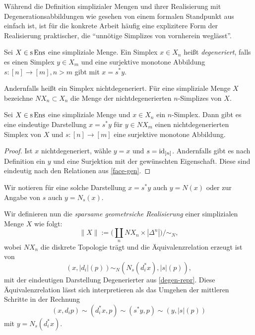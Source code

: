 Während die Definition simplizialer Mengen und ihrer Realisierung mit
Degenerationsabbildungen wie gesehen von einem formalen Standpunkt aus
einfach ist, ist für die konkrete Arbeit häufig eine explizitere Form
der Realisierung praktischer, die ``unnötige Simplizes von vornherein
weglässt''.
\begin{defn}[\cite{GM}, I.2.9]
  Sei $X \in \operatorname{s}\operatorname{Ens}$ eine simpliziale Menge. Ein Simplex $x \in X_n$
  heißt \emph{degeneriert}, falls es einen Simplex $y \in X_m$ und
  eine surjektive monotone Abbildung $s: [n] \to [m], n > m$ gibt mit
  $x = s^* y$.
\end{defn}
Andernfalls heißt ein Simplex nichtdegeneriert. Für eine simpliziale
Menge $X$ bezeichne $NX_n \subset X_n$ die Menge der
nichtdegenerierten $n$-Simplizes von $X$.
\begin{lemma} \label{degen-repr}
  Sei $X \in \operatorname{s}\operatorname{Ens}$ eine simpliziale Menge und $x \in X_n$ ein
  $n$-Simplex. Dann gibt es eine eindeutige Darstellung $x = s^* y$
  für $y \in NX_m$ einen nichtdegenerierten Simplex von $X$ und $s:
  [n] \to [m]$ eine surjektive monotone Abbildung.
\end{lemma}
\begin{proof}
  Ist $x$ nichtdegeneriert, wähle $y = x$ und $s =
  \operatorname{id}_{[n]}$. Andernfalls gibt es nach Definition ein $y$ und eine
  Surjektion mit der gewünschten Eigenschaft. Diese sind eindeutig
  nach den Relationen aus \ref{face-gen}.
\end{proof}
Wir notieren für eine solche Darstellung $x = s^* y$ auch $y = N(x)$
oder zur Angabe von $s$ auch $y = N_s(x)$.

Wir definieren nun die \emph{sparsame geometrsiche Realisierung} einer
simplizialen Menge $X$ wie folgt:
\[ \| X \| := \bigg( \coprod_n NX_n \times |\Delta^n| \bigg) \big/ \sim_N ,\]
wobei $NX_n$ die diskrete Topologie trägt und die Äquivalenzrelation
erzeugt ist von
\[ (x, |d_i|(p)) \sim_N (N_s(d_i^* x), |s|(p)), \]
mit der eindeutigen Darstellung Degenerierter aus
\ref{degen-repr}. Diese Äquivalenzrelation lässt sich interpretieren
als das Umgehen der mittleren Schritte in der Rechnung
\[ (x, d_i p) \sim (d_i^* x, p) \sim (s^* y, p)
   \sim (y, |s|(p)) \]
mit $y = N_s(d_i^* x)$.
   
